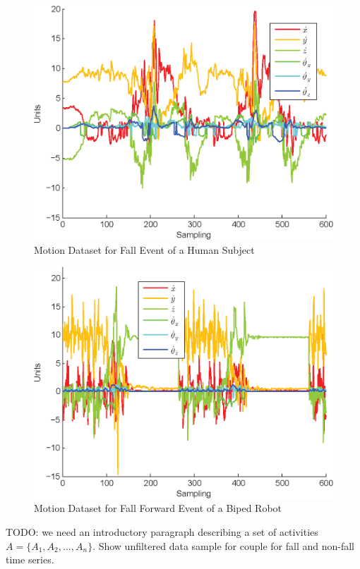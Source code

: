 \documentclass{IEEEtran}
\begin{document}
\begin{figure}[htb]
	\centering
		\includegraphics[width=0.95\columnwidth]{plots/human_falling-crop.eps}
	\caption{Motion Dataset for  Fall Event of a Human Subject}
	\label{fig:human_falling-crop}
\end{figure}

\begin{figure}[htb]
	\centering
		\includegraphics[width=0.95\columnwidth]{plots/robot_fallen_forward-crop.eps}
	\caption{Motion Dataset for Fall Forward Event of a Biped Robot}
	\label{fig:robot_fallen_forward-crop}
\end{figure}


TODO: we need an introductory paragraph describing a set of activities $A = \{A_1, A_2, 
\dots, A_n\}$. Show unfiltered data sample for couple for fall and non-fall time series. 
\end{document}
